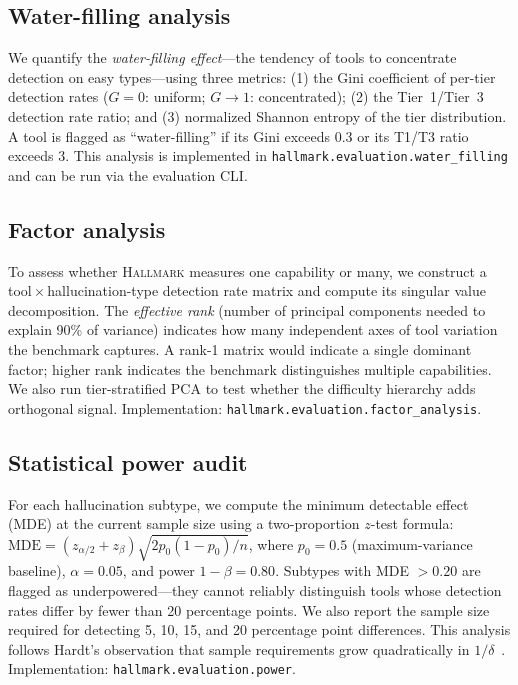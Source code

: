 \subsection{Water-filling analysis}
\label{app:water_filling}

We quantify the \emph{water-filling effect}---the tendency of tools to concentrate detection on easy types---using three metrics:
(1) the Gini coefficient of per-tier detection rates ($G = 0$: uniform; $G \to 1$: concentrated);
(2) the Tier~1/Tier~3 detection rate ratio; and
(3) normalized Shannon entropy of the tier distribution.
A tool is flagged as ``water-filling'' if its Gini exceeds 0.3 or its T1/T3 ratio exceeds 3.
This analysis is implemented in \texttt{hallmark.evaluation.water\_filling} and can be run via the evaluation CLI.

\subsection{Factor analysis}
\label{app:factor_analysis}

To assess whether \textsc{Hallmark} measures one capability or many, we construct a tool\,$\times$\,hallucination-type detection rate matrix and compute its singular value decomposition.
The \emph{effective rank} (number of principal components needed to explain 90\% of variance) indicates how many independent axes of tool variation the benchmark captures.
A rank-1 matrix would indicate a single dominant factor; higher rank indicates the benchmark distinguishes multiple capabilities.
We also run tier-stratified PCA to test whether the difficulty hierarchy adds orthogonal signal.
Implementation: \texttt{hallmark.evaluation.factor\_analysis}.

\subsection{Statistical power audit}
\label{app:power_audit}

For each hallucination subtype, we compute the minimum detectable effect (MDE) at the current sample size using a two-proportion $z$-test formula:
$\text{MDE} = (z_{\alpha/2} + z_\beta) \sqrt{2 p_0 (1-p_0) / n}$,
where $p_0 = 0.5$ (maximum-variance baseline), $\alpha = 0.05$, and power $1-\beta = 0.80$.
Subtypes with MDE $> 0.20$ are flagged as underpowered---they cannot reliably distinguish tools whose detection rates differ by fewer than 20 percentage points.
We also report the sample size required for detecting 5, 10, 15, and 20 percentage point differences.
This analysis follows Hardt's observation that sample requirements grow quadratically in $1/\delta$~\citep{hardt2025benchmarks}.
Implementation: \texttt{hallmark.evaluation.power}.

